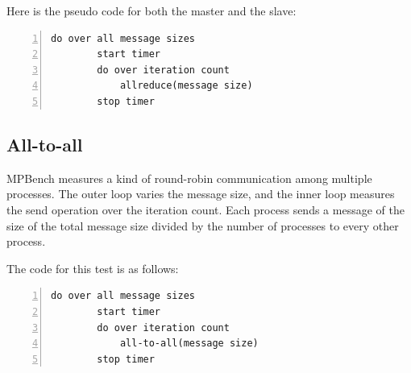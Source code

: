 Here is the pseudo code for both the master and the slave:

\begin{lstlisting}[frame=single,numbers=left]
    do over all message sizes 
        start timer
        do over iteration count 
            allreduce(message size) 
        stop timer
\end{lstlisting}


\subsection{All-to-all}

MPBench measures a kind of round-robin communication among multiple
processes. The outer loop varies the message size, and the inner loop
measures the send operation over the iteration count. Each process sends a
message of the size of the total message size divided by the number of
processes to every other process.

The code for this test is as follows:

\begin{lstlisting}[frame=single,numbers=left]
    do over all message sizes 
        start timer
        do over iteration count 
            all-to-all(message size)
        stop timer
\end{lstlisting}

\clearpage

